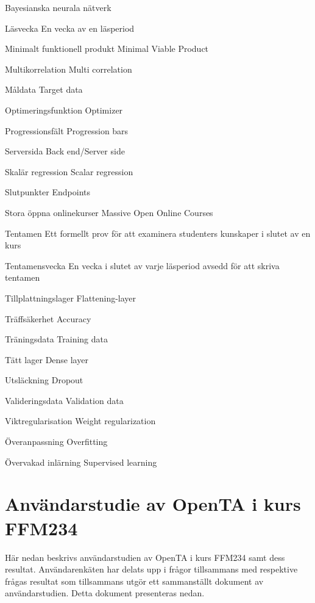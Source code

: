\begin{labeling}{Bayesianska neurala nätverk}
\item [Läsvecka]    En vecka av en läsperiod
\item [Minimalt funktionell produkt]	Minimal Viable Product
\item [Multikorrelation]	Multi correlation
\item [Måldata]	Target data
\item [Optimeringsfunktion]	Optimizer
\item [Progressionsfält]	Progression bars
\item [Serversida]	Back end/Server side
\item [Skalär regression]	Scalar regression
\item [Slutpunkter]	Endpoints
\item [Stora öppna onlinekurser]	Massive Open Online Courses
\item [Tentamen]    Ett formellt prov för att examinera studenters kunskaper i slutet av en kurs
\item [Tentamensvecka]  En vecka i slutet av varje läsperiod avsedd för att skriva tentamen
\item [Tillplattningslager]	Flattening-layer
\item [Träffsäkerhet]	Accuracy
\item [Träningsdata]	Training data
\item [Tätt lager]	Dense layer
\item [Utsläckning]	Dropout
\item [Valideringsdata]	Validation data
\item [Viktregularisation]	Weight regularization
\item [Överanpassning]	Overfitting
\item [Övervakad inlärning]	Supervised learning
\end{labeling}
\newpage

\section{Användarstudie av OpenTA i kurs FFM234}
\label{app:opentasurvey}


Här nedan beskrivs användarstudien av OpenTA i kurs FFM234 samt dess resultat. Användarenkäten har delats upp i frågor tillsammans med respektive frågas resultat som tillsammans utgör ett sammanställt dokument av användarstudien. Detta dokument presenteras nedan. 


